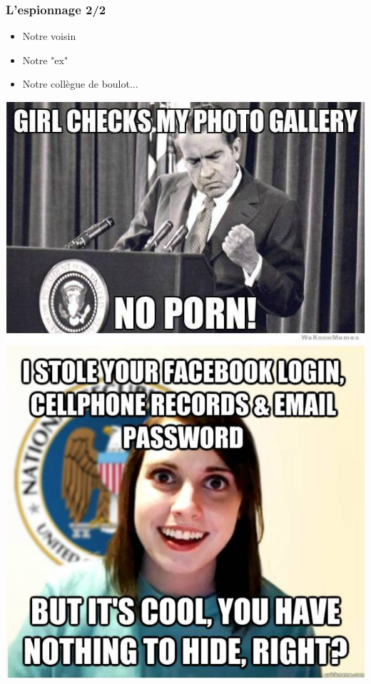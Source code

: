 \documentclass{beamer}
\begin{document}
\begin{frame}
\frametitle{L'espionnage 2/2}
\begin{itemize}
\item Notre voisin
\item Notre "ex"
\item Notre collègue de boulot...
\end{itemize}
\includegraphics[scale=0.55]{./images/nixon.jpg}
\includegraphics[scale=0.4]{./images/girlfriend.jpg}
\end{frame}
\end{document}
